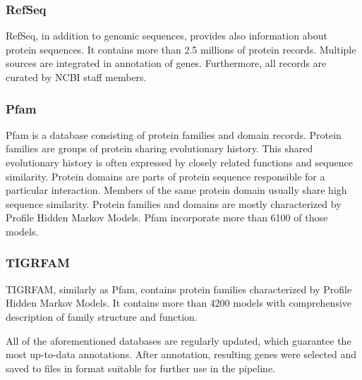 \subsubsection{RefSeq}
RefSeq, in addition to genomic sequences, provides also information about protein sequences.
It contains more than 2.5 millions of protein records.
Multiple sources are integrated in annotation of genes.
Furthermore, all records are curated by NCBI staff members.

\subsubsection{Pfam}
Pfam is a database consisting of protein families and domain records.
Protein families are groups of protein sharing evolutionary history.
This shared evolutionary history is often expressed by closely related functions and sequence similarity.
Protein domains are parts of protein sequence responsible for a particular interaction.
Members of the same protein domain usually share high sequence similarity.
Protein families and domains are mostly characterized by Profile Hidden Markov Models.
Pfam incorporate more than 6100 of those models.

\subsubsection{TIGRFAM}
TIGRFAM, similarly as Pfam, contains protein families characterized by Profile Hidden Markov Models.
It contains more than 4200 models with comprehensive description of family structure and function.

\vspace{\baselineskip}

All of the aforementioned databases are regularly updated, which guarantee the most up-to-data annotations. 
After annotation, resulting genes were selected and saved to files in format suitable for further use in the pipeline.

